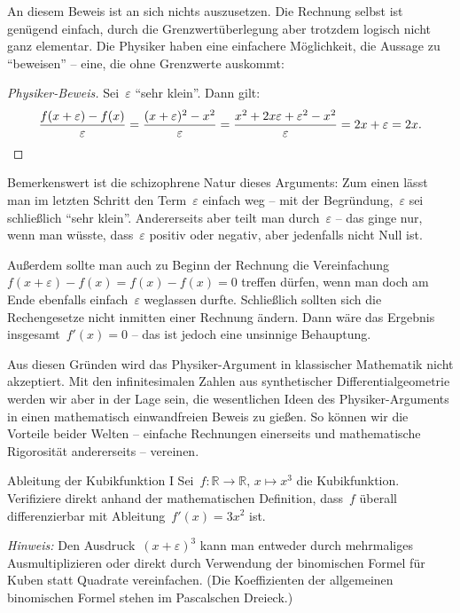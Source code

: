 \documentclass[twoside]{../zirkelblatt}
\newcommand{\RR}{\mathbb{R}}
\theoremstyle{definition}
\theoremstyle{plain}
\theoremstyle{remark}
\begin{document}
An diesem Beweis ist an sich nichts auszusetzen. Die Rechnung selbst ist genügend
einfach, durch die Grenzwertüberlegung aber trotzdem logisch nicht ganz
elementar. Die Physiker haben eine einfachere Möglichkeit, die Aussage zu
"`beweisen"' -- eine, die ohne Grenzwerte auskommt:

\begin{proof}[Physiker-Beweis]Sei~$\varepsilon$ "`sehr klein"'. Dann gilt:
\[ \frac{f(x + \varepsilon) - f(x)}{\varepsilon} =
  \frac{(x + \varepsilon)^2 - x^2}{\varepsilon} =
  \frac{x^2 + 2x\varepsilon + \varepsilon^2 - x^2}{\varepsilon} =
  2x + \varepsilon = 2x. \qedhere \]
\end{proof}

\label{par:schizophren}Bemerkenswert ist die schizophrene Natur dieses Arguments:
Zum einen lässt man im letzten Schritt den Term~$\varepsilon$ einfach weg --
mit der Begründung,~$\varepsilon$ sei schließlich "`sehr klein"'. Andererseits
aber teilt man durch~$\varepsilon$ -- das ginge nur, wenn man wüsste,
dass~$\varepsilon$ positiv oder negativ, aber jedenfalls nicht Null ist.

Außerdem sollte man auch zu Beginn der Rechnung die Vereinfachung~$f(x +
\varepsilon) - f(x) = f(x) - f(x) = 0$ treffen dürfen, wenn man doch am Ende
ebenfalls einfach~$\varepsilon$ weglassen durfte. Schließlich sollten sich die
Rechengesetze nicht inmitten einer Rechnung ändern. Dann wäre das Ergebnis
insgesamt~$f'(x) = 0$ -- das ist jedoch eine unsinnige Behauptung.

Aus diesen Gründen wird das Physiker-Argument in klassischer Mathematik
nicht akzeptiert. Mit den infinitesimalen Zahlen aus synthetischer
Differentialgeometrie werden wir aber in der Lage sein, die wesentlichen Ideen des
Physiker-Arguments in einen mathematisch einwandfreien Beweis zu gießen. So
können wir die Vorteile beider Welten -- einfache Rechnungen einerseits und
mathematische Rigorosität andererseits -- vereinen.

\begin{aufgabeShaded}{Ableitung der Kubikfunktion I}
Sei~$f : \RR \to \RR,\,x \mapsto x^3$ die Kubikfunktion. Verifiziere direkt
anhand der mathematischen Definition, dass~$f$ überall differenzierbar mit
Ableitung~$f'(x) = 3x^2$ ist.

\emph{Hinweis:} Den Ausdruck~$(x + \varepsilon)^3$ kann man entweder durch
mehrmaliges Ausmultiplizieren oder direkt durch Verwendung der binomischen
Formel für Kuben statt Quadrate vereinfachen. (Die Koeffizienten der
allgemeinen binomischen Formel stehen im Pascalschen Dreieck.)
\end{aufgabeShaded}
\end{document}
